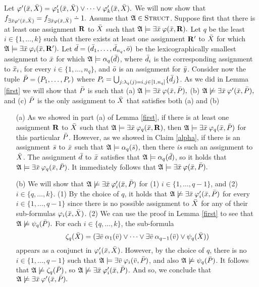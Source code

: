 \begin{enumerate}
	Let $\varphi^\prime(\x,\X) = \varphi_1^\prime(\x,\X)\vee\cdots\vee\varphi_k^\prime(\x,\X).$ We will now show that $f_{\exists\x\varphi^\prime(\x,\X)} = f_{\exists\x\varphi(\x,\X)}\dotminus 1.$ Assume that $\A\in\str$. Suppose first that there is at least one assignment $\R$ to $\X$ such that $\A\models\exists\x\:\varphi(\x,\R).$ Let $q$ be the least $i\in\{1,\ldots,k\}$ such that there exists at least one assignment $\R^\prime$ to $\X$ for which $\A\models\exists\x\:\varphi_i(\x,\R^\prime).$ Let $\d = (\d_1,\dots,\d_{n_q},\ep)$ be the lexicographically smallest assignment to $\x$ for which $\A\models\alpha_q(\d)$, where $\d_i$ is the corresponding assignment to $\x_i$, for every $i\in\{1,\dots,n_q\}$, and $\ep$ is an assignment for $\y$. Consider now the tuple $\P = (P_1,\dots,P_r)$ where $P_i = \bigcup_{j:\lambda_q(j)=i,j\in[1,n_q]}\{\d_j\}$. As we did in Lemma \ref{first} we will show that $\P$ is such that (a) $\A\models\exists\x\:\varphi(\x,\P),$ (b) $\A\not\models\exists\x\:\varphi^\prime(\x,\P),$ and (c) $\P$ is the only assignment to $\X$ that satisfies both (a) and (b)
	\begin{enumerate}
		\item[(a)] As we showed in part (a) of Lemma \ref{first}, if there is at least one assignment $\R$ to $\X$ such that $\A\models\exists\x\:\varphi_q(\x,\R)$, then $\A\models\exists\x\:\varphi_q(\x,\P)$ for this particular $\P$. However, as we showed in Claim \ref{alpha}, if there is an assignment $\s$ to $\x$ such that $\A\models\alpha_q(\s)$, then there {\em is} such an assignment to $\X$. The assignment $\d$ to $\x$ satisfies that $\A\models\alpha_q(\d)$, so it holds that $\A\models\exists\x\:\varphi_q(\x,\P)$. It immediately follows that $\A\models\exists\x\:\varphi(\x,\P).$
		
		\item[(b)] We will show that $\A\not\models\exists\x\:\varphi^\prime_i(\x,\P)$ for (1) $i\in\{1,\ldots,q-1\}$, and (2) $i\in\{q,\ldots,k\}$. (1) By the choice of $q$, it holds that $\A\not\models\exists\x\:\varphi^\prime_i(\x,\P)$ for every $i\in\{1,\ldots,q-1\}$ since there is no possible assignment to $\X$ for any of their sub-formulas $\varphi_i(\x,\X)$. (2) We can use the proof in Lemma \ref{first} to see that $\A\not\models\psi_q(\P).$ For each $i\in\{q,\ldots,k\}$, the sub-formula 
		$$ \zeta_q(\X) =  (\exists\v\:\alpha_1(\v)\vee\cdots\vee\exists\v\:\alpha_{q-1}(\v)\vee\psi_q(\X)) $$ 
		appears as a conjunct in $\varphi^\prime_i(\x,\X)$. However, by the choice of $q$, there is no $i\in\{1,\ldots,q-1\}$ such that $\A\models\exists\v\:\varphi_i(\v,\P)$, and also $\A\not\models\psi_q(\P)$. It follows that $\A\not\models\zeta_q(\P)$,  so $\A\not\models\exists\x\:\varphi^\prime_i(\x,\P)$. And so, we conclude that $\A\not\models\exists\x\:\varphi^\prime(\x,\P).$
		

\end{enumerate}
\end{enumerate}
